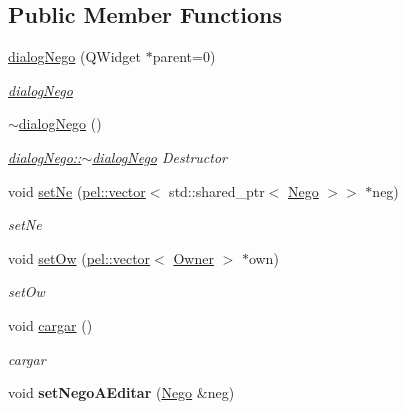 \subsection*{Public Member Functions}
\begin{DoxyCompactItemize}
\item 
\hyperlink{classdialogNego_ab093ca8a15c030021d87c540bc5d4da1}{dialog\+Nego} (Q\+Widget $\ast$parent=0)
\begin{DoxyCompactList}\small\item\em \hyperlink{classdialogNego}{dialog\+Nego} \end{DoxyCompactList}\item 
\hypertarget{classdialogNego_a265a261b0955aa364d86237337196ece}{}\hyperlink{classdialogNego_a265a261b0955aa364d86237337196ece}{$\sim$dialog\+Nego} ()\label{classdialogNego_a265a261b0955aa364d86237337196ece}

\begin{DoxyCompactList}\small\item\em \hyperlink{classdialogNego_a265a261b0955aa364d86237337196ece}{dialog\+Nego\+::$\sim$dialog\+Nego} Destructor \end{DoxyCompactList}\item 
void \hyperlink{classdialogNego_a0cbc10fc159e2ec9f3c3c6be5dfbaafe}{set\+Ne} (\hyperlink{classpel_1_1vector}{pel\+::vector}$<$ std\+::shared\+\_\+ptr$<$ \hyperlink{classNego}{Nego} $>$$>$ $\ast$neg)
\begin{DoxyCompactList}\small\item\em set\+Ne \end{DoxyCompactList}\item 
void \hyperlink{classdialogNego_af265229e308fce176de8fd15a28f7b21}{set\+Ow} (\hyperlink{classpel_1_1vector}{pel\+::vector}$<$ \hyperlink{classOwner}{Owner} $>$ $\ast$own)
\begin{DoxyCompactList}\small\item\em set\+Ow \end{DoxyCompactList}\item 
void \hyperlink{classdialogNego_af1374fbe14187ccd7022b1b0d2ec34be}{cargar} ()
\begin{DoxyCompactList}\small\item\em cargar \end{DoxyCompactList}\item 
\hypertarget{classdialogNego_a4c9eaaf8f8e98d27cdadb7a27d6b4392}{}void {\bfseries set\+Nego\+A\+Editar} (\hyperlink{classNego}{Nego} \&neg)\label{classdialogNego_a4c9eaaf8f8e98d27cdadb7a27d6b4392}

\end{DoxyCompactItemize}


